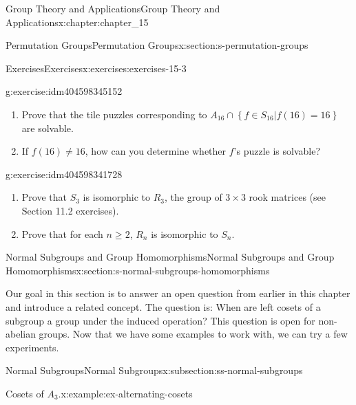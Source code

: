 \documentclass[twoside,10pt,]{book}
\numberwithin{equation}{section}
\begin{document}
\begin{chapterptx}{Group Theory and Applications}{}{Group Theory and Applications}{}{}{x:chapter:chapter_15}
\begin{sectionptx}{Permutation Groups}{}{Permutation Groups}{}{}{x:section:s-permutation-groups}
\begin{exercises-subsection}{Exercises}{}{Exercises}{}{}{x:exercises:exercises-15-3}
\begin{divisionexercise}{12}{}{}{g:exercise:idm404598345152}%
%
\begin{enumerate}[label=(\alph*)]
\item{}Prove that the tile puzzles corresponding to \(A_{16}\cap  \left\{ \left.f \in S_{16} \right| f(16) = 16\right\}\) are solvable.%
\item{}If  \(f(16)\neq  16\), how can you determine whether  \(f\)'s puzzle is solvable?%
\end{enumerate}
%
\end{divisionexercise}%
\begin{divisionexercise}{13}{}{}{g:exercise:idm404598341728}%
%
\begin{enumerate}[label=(\alph*)]
\item{}Prove that \(S_3\) is isomorphic to \(R_3\),  the group of \(3 \times 3\) rook matrices (see Section 11.2 exercises).%
\item{}Prove that for each \(n \geq  2\), \(R_n\) is isomorphic to \(S_n\).%
\end{enumerate}
%
\end{divisionexercise}%
\end{exercises-subsection}
\end{sectionptx}
%
%
\typeout{************************************************}
\typeout{************************************************}
%
\begin{sectionptx}{Normal Subgroups and Group Homomorphisms}{}{Normal Subgroups and Group Homomorphisms}{}{}{x:section:s-normal-subgroups-homomorphisms}
%
%
\begin{introduction}{}%
Our goal in this section is to answer an open question from earlier in this chapter and introduce a related concept. The question is: When are left cosets of a subgroup a group under the induced operation? This question is open for non-abelian groups. Now that we have some examples to work with, we can try a few experiments.%
\end{introduction}%
%
%
\typeout{************************************************}
\typeout{************************************************}
%
\begin{subsectionptx}{Normal Subgroups}{}{Normal Subgroups}{}{}{x:subsection:ss-normal-subgroups}
%
\begin{example}{Cosets of \(A_3\).}{x:example:ex-alternating-cosets}%

\end{example}
\end{subsectionptx}
\end{sectionptx}
\end{chapterptx}
\end{document}
